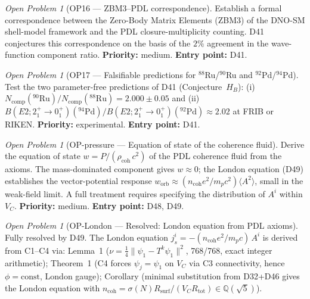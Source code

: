 \documentclass[11pt,a4paper]{article}
\theoremstyle{plain}
\theoremstyle{definition}
\theoremstyle{remark}
\newtheorem{openproblem}[theorem]{Open Problem}
\newcommand{\Rsurf}{R_{\mathrm{surf}}}
\newcommand{\Rtot}{R_{\mathrm{tot}}}
\newcommand{\rhocoh}{\rho_{\mathrm{coh}}}
\begin{document}
\begin{openproblem}[OP16 --- ZBM3--PDL correspondence]
\label{op:ZBM3}
Establish a formal correspondence between the Zero-Body Matrix Elements (ZBM3) of the DNO-SM shell-model framework and the PDL closure-multiplicity counting. D41 conjectures this correspondence on the basis of the $2\%$ agreement in the wave-function component ratio. \textbf{Priority:} medium. \textbf{Entry point:} D41.
\end{openproblem}

\begin{openproblem}[OP17 --- Falsifiable predictions for $^{88}$Ru/$^{90}$Ru and $^{92}$Pd/$^{94}$Pd]
\label{op:FRIB}
Test the two parameter-free predictions of D41 (Conjecture~$H_B$): (i) $N_{\mathrm{comp}}(^{90}\mathrm{Ru})/N_{\mathrm{comp}}(^{88}\mathrm{Ru})=2.000\pm0.05$ and (ii) $B(E2;2^+_1\!\to\!0^+_1)(^{94}\mathrm{Pd})/B(E2;2^+_1\!\to\!0^+_1)(^{92}\mathrm{Pd})\approx 2.02$ at FRIB or RIKEN. \textbf{Priority:} experimental. \textbf{Entry point:} D41.
\end{openproblem}

\begin{openproblem}[OP-pressure --- Equation of state of the coherence fluid]
\label{op:pressure}
Derive the equation of state $w = P/(\rhocoh\,c^2)$ of the PDL coherence fluid from the axioms. The mass-dominated component gives $w \approx 0$; the London equation (D49) establishes the vector-potential response $w_{\mathrm{orb}} \approx (n_{\mathrm{coh}} e^2/m_p c^2)\langle A^2\rangle$, small in the weak-field limit. A full treatment requires specifying the distribution of $A^i$ within $V_C$. \textbf{Priority:} medium. \textbf{Entry point:} D48, D49.
\end{openproblem}

\begin{openproblem}[OP-London --- Resolved: London equation from PDL axioms]
\label{op:London}
\textcolor{proofblue}{Fully resolved by D49.} The London equation $j^i_s = -(n_{\mathrm{coh}} e^2/m_p c)\,A^i$ is derived from C1--C4 via: Lemma~1 ($\nu = \tfrac{1}{4}\|\psi_1 - T^k\psi_1\|^2$, 768/768, exact integer arithmetic); Theorem~1 (C4 forces $\psi_j = \psi_1$ on $V_C$ via C3 connectivity, hence $\phi = \mathrm{const}$, London gauge); Corollary (minimal substitution from D32+D46 gives the London equation with $n_{\mathrm{coh}} = \sigma(N)\Rsurf/(V_C\Rtot) \in \mathbb{Q}(\sqrt{5})$).
\end{openproblem}

\end{document}
